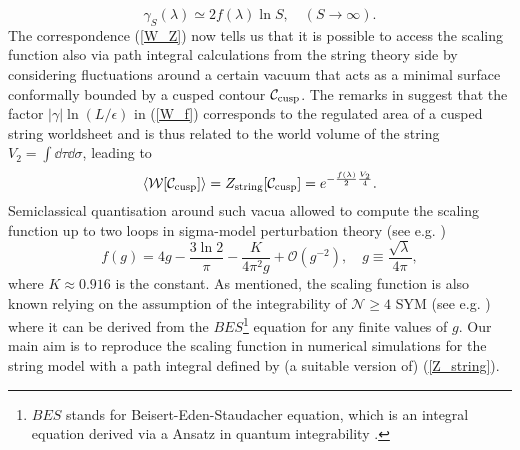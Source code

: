 %
%
\begin{equation}
\gamma_{S}(\lambda) \simeq 2 f(\lambda) \ln S,\quad  (S\to \infty).
\end{equation}
%
%
The correspondence (\ref{W_Z}) now tells us that it is possible to access the scaling function also via path integral calculations from the string theory side by considering fluctuations around a certain vacuum that acts as a minimal surface conformally bounded by a cusped contour $\mathcal{C}_{\rm cusp}$.  The remarks in \cite{Kruczenski:2002fb,Kruczenski:2007cy} suggest that the factor $\vert \gamma\vert \ln (L/\epsilon)$ in (\ref{W_f}) corresponds to the regulated area of a cusped string worldsheet and is thus related to the world volume of the string $V_{2}=\int \dd\tau \dd \sigma$, leading to
%
%
\begin{equation}
\langle \mathcal{W}[\mathcal{C_{\rm cusp}}] \rangle =Z_{\rm string}[\mathcal{C_{\rm cusp}}] = e^{-\frac{f(\lambda)}{2}\frac{V_{2}}{4}}.
\label{eq: W_exp_f}
\end{equation}
Semiclassical quantisation around such vacua allowed to compute the scaling function up to two loops in sigma-model perturbation theory (see e.g. \cite{Giombi:2009gd})
%
%
\begin{equation}
f(g) = 4g - \frac{3\ln 2}{\pi} - \frac{K}{4\pi^{2}g} + \mathcal{O}(g^{-2}), \quad g\equiv \frac{\sqrt{\lambda}}{4\pi},
\label{eq: scaling_fct}
\end{equation}
%
%
where $K\approx 0.916$ is the  constant. As mentioned, the scaling function is also known relying on the assumption of the integrability of $\mathcal{N}\geq 4$ SYM (see e.g. \cite{Beisert:2010jr}) where it can be derived from the $BES$\footnote{$BES$ stands for Beisert-Eden-Staudacher equation, which is an integral equation derived via a  Ansatz in quantum integrability \cite{Beisert:2006ez}.} equation for any finite values of $g$. Our main aim is to reproduce the scaling function in numerical simulations for the string model with a path integral defined by (a suitable version of) (\ref{Z_string}).
%
%
%
%
%
%
%
%
%
